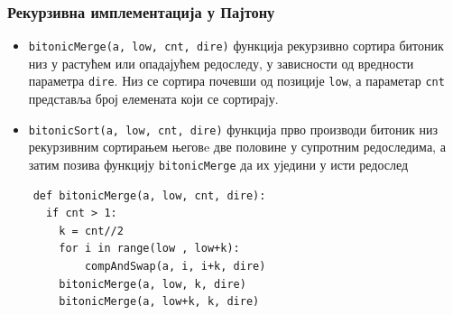 \begin{frame}[fragile]
\frametitle{Рекурзивна имплементација у Пајтону}
 \begin{itemize}
  \item \verb+bitonicMerge(a, low, cnt, dire)+ функција \alert{рекурзивно сортира битоник низ} у растућем или опадајућем редоследу, у зависности од вредности параметра \verb+dire+. Низ се сортира почевши од позиције \verb+low+, а параметар \verb+cnt+ представља број елемената који се сортирају.
  \item \verb+bitonicSort(a, low, cnt, dire)+ функција прво \alert{производи битоник низ} рекурзивним сортирањем његовe две половине у супротним редоследима, а затим позива функцију \verb+bitonicMerge+ да их уједини у исти редослед
 \end{itemize}
  \begin{verbatim}
    def bitonicMerge(a, low, cnt, dire):
      if cnt > 1:
        k = cnt//2
        for i in range(low , low+k):
            compAndSwap(a, i, i+k, dire)
        bitonicMerge(a, low, k, dire)
        bitonicMerge(a, low+k, k, dire)
  \end{verbatim}

\end{frame}

